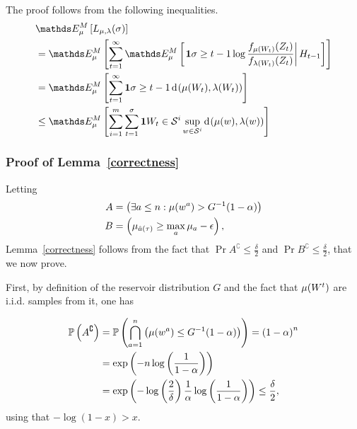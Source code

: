 The proof follows from the following inequalities.
\begin{align*}
& \ETrueModel{ L_{\ArmMean,\ArmMeanAlt}(\sigma) } \\
&= \ETrueModel{ \sum_{t=1}^\infty
	\ETrueModel{ \left.\1{\sigma \geq t-1} \log
	\frac{f_{\ArmMean(\armRV_t)}(\rewardRV_t)}{f_{\ArmMeanAlt(\armRV_t)}(\rewardRV_t)} \right|
	\historyRV_{t-1}}}\\
& = \ETrueModel{ \sum_{t=1}^\infty \1{\sigma \geq t-1}
\ArmKL{\ArmMean(\armRV_t)}{\ArmMeanAlt(\armRV_t)}} \\
& \leq  \ETrueModel{ \sum_{i=1}^m \sum_{t=1}^\sigma \1{\armRV_t \in \ArmGrp{i}}
\sup_{\arm \in \ArmGrp{i}} \ArmKL{\ArmMean(\arm)}{\ArmMeanAlt(\arm)} }
\end{align*}


\subsubsection{Proof of Lemma~\ref{correctness}}\label{proof:correctness}

Letting
\begin{align*}
A & =  \left(\exists a \leq n : \mu(w^a) > G^{-1}(1-\alpha)\right) \\
B & =  \left(\mu_{\hat{a}(\tau)} \geq \max_{a} \mu_a - \epsilon\right),
\end{align*}
Lemma~\ref{correctness} follows from the fact that $\Pr{A^\complement}\leq \frac{\delta}{2}$ and $\Pr{B^\complement} \leq \frac{\delta}{2}$, that we now prove. 

First, by definition of the reservoir distribution $G$ and the fact that $\mu(W^t)$ are i.i.d. samples from it, one has

\begin{align*}
 \mathbb{P}\left( A^\complement \right) & =  \mathbb{P}\left( \bigcap_{a = 1}^n\left( \mu(w^a) \leq G^{-1}(1-\alpha)\right) \right)
 	= \left(1 - \alpha \right)^n \\
 & =  \exp\left(-n\log\left(\frac{1}{1- \alpha}\right)\right) \\
 & =  \exp\left(-\log\left(\frac{2}{\delta}\right)\frac{1}{\alpha}\log\left(\frac{1}{1- \alpha}\right)\right) \leq \frac{\delta}{2},
\end{align*}
using that $-\log(1-x)>x$. 

